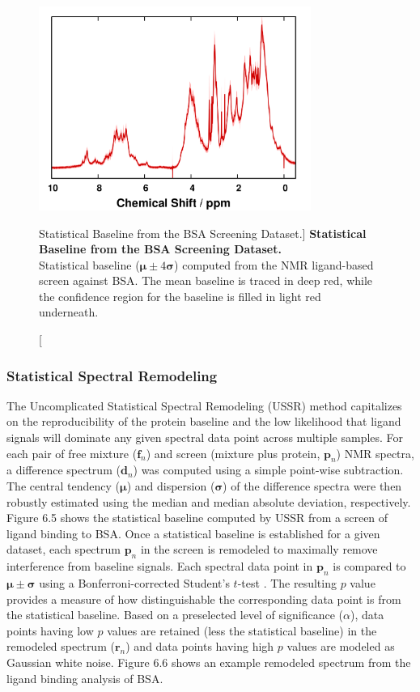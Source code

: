 \begin{figure}
\includegraphics[width=3.5in]{figs/pscorr/05-baseline.png}
\caption
      [Statistical Baseline from the BSA Screening Dataset.]{
  {\bf Statistical Baseline from the BSA Screening Dataset.}
  \\
  Statistical baseline ($\boldsymbol{\mu} \pm 4 \boldsymbol{\sigma}$) computed
  from the \hnmr{} NMR ligand-based screen against BSA. The mean baseline is
  traced in deep red, while the confidence region for the baseline is filled
  in light red underneath.
}
\end{figure}

\subsubsection{Statistical Spectral Remodeling}

\begin{doublespace}
The Uncomplicated Statistical Spectral Remodeling (USSR) method capitalizes on
the reproducibility of the protein baseline and the low likelihood that ligand
signals will dominate any given spectral data point across multiple samples.
For each pair of free mixture ($\mathbf{f}_n$) and screen (mixture plus
protein, $\mathbf{p}_n$) \hnmr{} NMR spectra, a difference spectrum
($\mathbf{d}_n$) was computed using a simple point-wise subtraction. The
central tendency ($\boldsymbol{\mu}$) and dispersion ($\boldsymbol{\sigma}$)
of the difference spectra were then robustly estimated using the median and
median absolute deviation, respectively. Figure 6.5 shows the statistical
baseline computed by USSR from a screen of ligand binding to BSA. Once a
statistical baseline is established for a given dataset, each spectrum
$\mathbf{p}_n$ in the screen is remodeled to maximally remove interference
from baseline signals. Each spectral data point in $\mathbf{p}_n$ is compared
to $\boldsymbol{\mu} \pm \boldsymbol{\sigma}$ using a Bonferroni-corrected
Student's $t$-test \cite{dunn:jasa1961}. The resulting $p$ value provides a
measure of how distinguishable the corresponding data point is from the
statistical baseline. Based on a preselected level of significance ($\alpha$),
data points having low $p$ values are retained (less the statistical baseline)
in the remodeled spectrum ($\mathbf{r}_n$) and data points having high $p$
values are modeled as Gaussian white noise. Figure 6.6 shows an example
remodeled spectrum from the ligand binding analysis of BSA.
\end{doublespace}

